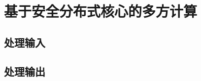\section{基于安全分布式核心的多方计算}\label{sec:22-4}

\subsection{处理输入}\label{subsec:22-4-1}

\subsection{处理输出}\label{subsec:22-4-2}